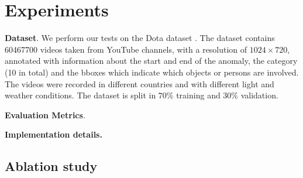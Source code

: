 \section{Experiments}

\noindent\textbf{Dataset}.
We perform our tests on the Dota dataset \cite{9712446}.
The dataset contains 60467700 videos taken from YouTube channels, with a resolution of $1024 \times 720$, annotated with information about the start and end of the anomaly, the category (10 in total) and the bboxes which indicate which objects or persons are involved.
The videos were recorded in different countries and with different light and weather conditions.
The dataset is split in $70\%$ training and $30\%$ validation.

\noindent\textbf{Evaluation Metrics}.

\noindent\textbf{Implementation details.}

\subsection{Ablation study}
